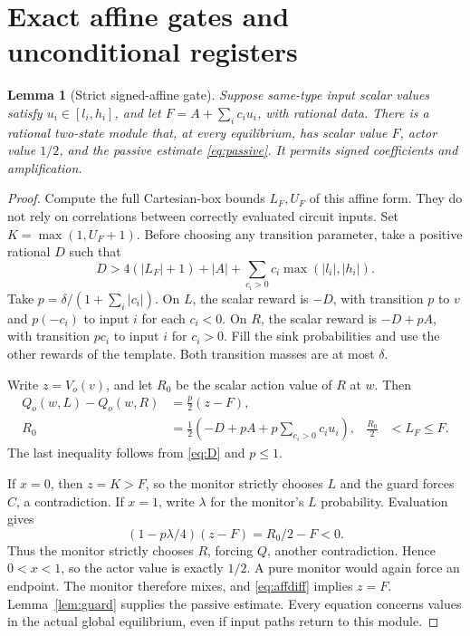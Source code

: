 \documentclass[11pt,a4paper]{article}
\numberwithin{equation}{section}
\newtheorem{lemma}[theorem]{Lemma}
\theoremstyle{definition}
\begin{document}
\section{Exact affine gates and unconditional registers}\label{sec:linear}

\begin{lemma}[Strict signed-affine gate]\label{lem:affine}
Suppose same-type input scalar values satisfy
\(u_i\in[l_i,h_i]\), and let \(F=A+\sum_i c_i u_i\), with rational
data. There is a rational two-state module that, at every equilibrium,
has scalar value \(F\), actor value \(1/2\), and the passive estimate
\eqref{eq:passive}. It permits signed coefficients and amplification.
\end{lemma}
\begin{proof}
Compute the full Cartesian-box bounds \(L_F,U_F\) of this affine form.
They do not rely on correlations between correctly evaluated circuit
inputs. Set \(K=\max(1,U_F+1)\). Before choosing any transition
parameter, take a positive rational \(D\) such that
\begin{equation}\label{eq:D}
 D>4(|L_F|+1)+|A|
       +\sum_{c_i>0}c_i\max(|l_i|,|h_i|).
\end{equation}
Take \(p=\delta/(1+\sum_i|c_i|)\). On \(L\), the scalar reward is
\(-D\), with transition \(p\) to \(v\) and \(p(-c_i)\) to input
\(i\) for each \(c_i<0\). On \(R\), the scalar reward is \(-D+pA\),
with transition \(pc_i\) to input \(i\) for \(c_i>0\). Fill the sink
probabilities and use the other rewards of the template. Both transition
masses are at most \(\delta\).

Write \(z=V_o(v)\), and let \(R_0\) be the scalar action value of
\(R\) at \(w\). Then
\begin{align}
 Q_o(w,L)-Q_o(w,R)&=\frac p2(z-F),\label{eq:affdiff}\\
 R_0&=\frac12\left(-D+pA+p\sum_{c_i>0}c_i u_i\right),
 &\frac{R_0}{2}&<L_F\leq F.\label{eq:afflow}
\end{align}
The last inequality follows from \eqref{eq:D} and \(p\leq1\).

If \(x=0\), then \(z=K>F\), so the monitor strictly chooses \(L\)
and the guard forces \(C\), a contradiction. If \(x=1\), write
\(\lambda\) for the monitor's \(L\) probability. Evaluation gives
\[
 (1-p\lambda/4)(z-F)=R_0/2-F<0.
\]
Thus the monitor strictly chooses \(R\), forcing \(Q\), another
contradiction. Hence \(0<x<1\), so the actor value is exactly \(1/2\).
A pure monitor would again force an endpoint. The monitor therefore mixes,
and \eqref{eq:affdiff} implies \(z=F\). Lemma~\ref{lem:guard} supplies
the passive estimate. Every equation concerns values in the actual global
equilibrium, even if input paths return to this module.
\end{proof}
\end{document}
